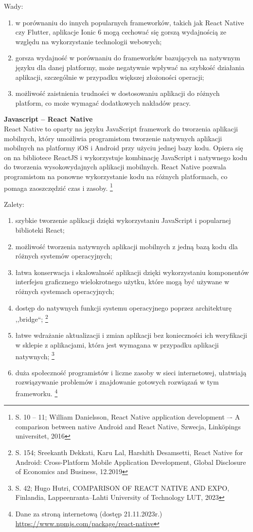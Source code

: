 \documentclass[12pt, a4paper, twoside, openany]{book}
\begin{document}
Wady:
\begin{enumerate}[label=--]
    \item w porównaniu do innych popularnych frameworków, takich jak React Native czy Flutter, aplikacje Ionic 6 mogą cechować się gorszą wydajnością ze względu na wykorzystanie technologii webowych;
    \item gorsza wydajność w porównaniu do frameworków bazujących na natywnym języku dla danej platformy, może negatywnie wpływać na szybkość działania aplikacji, szczególnie w przypadku większej złożoności operacji;
    \item możliwość zaistnienia trudności w dostosowaniu aplikacji do różnych platform, co może wymagać dodatkowych nakładów pracy.
\end{enumerate}

\textbf{Javascript -- React Native\\}
\indent React Native to oparty na języku JavaScript framework do tworzenia aplikacji mobilnych, który umożliwia programistom tworzenie natywnych aplikacji mobilnych na platformy iOS i Android przy użyciu jednej bazy kodu.
Opiera się on na bibliotece ReactJS i wykorzystuje kombinację JavaScript i natywnego kodu do tworzenia wysokowydajnych aplikacji mobilnych.
React Native pozwala programistom na ponowne wykorzystanie kodu na różnych platformach, co pomaga zaoszczędzić czas i zasoby. \footnote{S. 10 -- 11; William Danielsson, React Native application development –- A comparison between native Android and React Native, Szwecja, Linköpings universitet, 2016}

Zalety:
\begin{enumerate}[label=--]
    \item szybkie tworzenie aplikacji dzięki wykorzystaniu JavaScript i popularnej biblioteki React;
    \item możliwość tworzenia natywnych aplikacji mobilnych z jedną bazą kodu dla różnych systemów operacyjnych;
    \item łatwa konserwacja i skalowalność aplikacji dzięki wykorzystaniu komponentów interfejsu graficznego wielokrotnego użytku, które mogą być używane w różnych systemach operacyjnych;
    \item dostęp do natywnych funkcji systemu operacyjnego poprzez architekturę ,,bridge``; \footnote{S. 154; Sreekanth Dekkati, Karu Lal, Harshith Desamsetti, React Native for Android: Cross-Platform Mobile Application Development, Global Disclosure of Economics and Business, 12.2019}
    \item łatwe wdrażanie aktualizacji i zmian aplikacji bez konieczności ich weryfikacji w sklepie z aplikacjami, która jest wymagana w przypadku aplikacji natywnych; \footnote{S. 42; Hugo Hutri, COMPARISON OF REACT NATIVE AND EXPO, Finlandia, Lappeenranta–Lahti University of Technology LUT, 2023}
    \item duża społeczność programistów i liczne zasoby w sieci internetowej, ułatwiają rozwiązywanie problemów i znajdowanie gotowych rozwiązań w tym frameworku. \footnote{Dane za stroną internetową (dostęp 21.11.2023r.) \url{https://www.npmjs.com/package/react-native}}
\end{enumerate}
\end{document}
